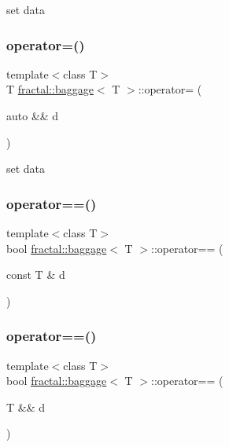 set data 

\mbox{\label{classfractal_1_1baggage_a8904eb0c82e97fd1be2be7dbf9edf8a8}} 
\subsubsection{\texorpdfstring{operator=()}{operator=()}\hspace{0.1cm}{\footnotesize\ttfamily [2/2]}}
{\footnotesize\ttfamily template$<$class T$>$ \\
T \hyperlink{classfractal_1_1baggage}{fractal\+::baggage}$<$ T $>$\+::operator= (\begin{DoxyParamCaption}\item[{auto \&\&}]{d }\end{DoxyParamCaption})\hspace{0.3cm}{\ttfamily [inline]}}



set data 

\mbox{\label{classfractal_1_1baggage_ab193ca2ecc402a6f72cde64a12d9844d}} 
\subsubsection{\texorpdfstring{operator==()}{operator==()}\hspace{0.1cm}{\footnotesize\ttfamily [1/2]}}
{\footnotesize\ttfamily template$<$class T$>$ \\
bool \hyperlink{classfractal_1_1baggage}{fractal\+::baggage}$<$ T $>$\+::operator== (\begin{DoxyParamCaption}\item[{const T \&}]{d }\end{DoxyParamCaption})\hspace{0.3cm}{\ttfamily [inline]}}

\mbox{\label{classfractal_1_1baggage_af6cfa387876a27f6eab20938fc428d29}} 
\subsubsection{\texorpdfstring{operator==()}{operator==()}\hspace{0.1cm}{\footnotesize\ttfamily [2/2]}}
{\footnotesize\ttfamily template$<$class T$>$ \\
bool \hyperlink{classfractal_1_1baggage}{fractal\+::baggage}$<$ T $>$\+::operator== (\begin{DoxyParamCaption}\item[{T \&\&}]{d }\end{DoxyParamCaption})\hspace{0.3cm}{\ttfamily [inline]}}

